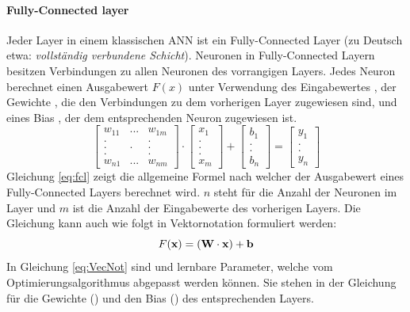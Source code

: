 \paragraph{Fully-Connected layer}
Jeder Layer in einem klassischen ANN ist ein Fully-Connected Layer (zu Deutsch etwa: \textit{vollständig verbundene Schicht}). Neuronen in Fully-Connected Layern besitzen Verbindungen zu allen Neuronen des vorrangigen Layers. Jedes Neuron berechnet einen Ausgabewert $F(x)$ unter Verwendung des Eingabewertes , der Gewichte , die den Verbindungen zu dem vorherigen Layer zugewiesen sind, und eines Bias , der dem entsprechenden Neuron zugewiesen ist. 
\begin{equation}
\label{eq:fcl}
\begin{bmatrix}
w_{11} & ... & w_{1m}\\
. &  & .\\
. & . & .\\
. &  & .\\
w_{n1} & ... & w_{nm} 
\end{bmatrix} \cdot
\begin{bmatrix}
x_1\\
.\\
.\\
.\\
x_m
\end{bmatrix} + 
\begin{bmatrix}
b_1\\
.\\
.\\
b_n
\end{bmatrix} = 
\begin{bmatrix}
y_1\\
.\\
.\\
y_n
\end{bmatrix}
\end{equation}
Gleichung \ref{eq:fcl} zeigt die allgemeine Formel nach welcher der Ausgabewert eines Fully-Connected Layers berechnet wird. $n$ steht für die Anzahl der Neuronen im Layer und $m$ ist die Anzahl der Eingabewerte des vorherigen Layers. Die Gleichung kann auch wie folgt in Vektornotation formuliert werden: 
\begin{equation}
\label{eq:VecNot}
F(\vect{x}) = (\mat{W} \cdot \vect{x}) + \vect{b}
\end{equation} 
In Gleichung \ref{eq:VecNot} sind  und  lernbare Parameter, welche vom Optimierungsalgorithmus abgepasst werden können. Sie stehen in der Gleichung für die Gewichte () und den Bias () des entsprechenden Layers.

